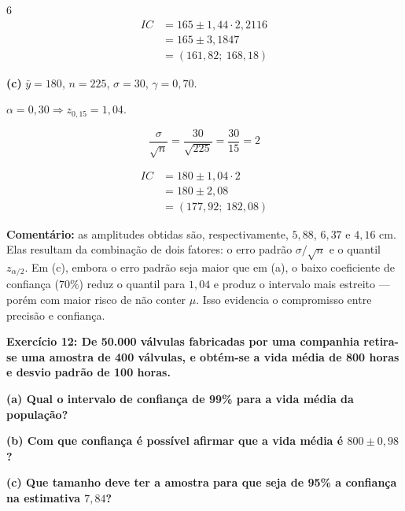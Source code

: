 \documentclass[8pt, a4paper, landscape]{extarticle}
\begin{document}
\begin{multicols}{6}
\begin{equation*}
\begin{split}
IC &= 165 \pm 1,44 \cdot 2,2116 \\
&= 165 \pm 3,1847 \\
&= (161,82;\ 168,18)
\end{split}
\end{equation*}

\vspace{0.2cm}

\textbf{(c)} $\bar{y} = 180$, $n = 225$, $\sigma = 30$, $\gamma = 0,70$.

$\alpha = 0,30 \Rightarrow z_{0,15} = 1,04$.

\begin{equation*}
\frac{\sigma}{\sqrt{n}} = \frac{30}{\sqrt{225}} = \frac{30}{15} = 2
\end{equation*}

\begin{equation*}
\begin{split}
IC &= 180 \pm 1,04 \cdot 2 \\
&= 180 \pm 2,08 \\
&= (177,92;\ 182,08)
\end{split}
\end{equation*}

\vspace{0.2cm}

\textbf{Comentário:} as amplitudes obtidas são, respectivamente, $5,88$, $6,37$ e $4,16$ cm. Elas resultam da combinação de dois fatores: o erro padrão $\sigma/\sqrt{n}$ e o quantil $z_{\alpha/2}$. Em (c), embora o erro padrão seja maior que em (a), o baixo coeficiente de confiança ($70\%$) reduz o quantil para $1,04$ e produz o intervalo mais estreito — porém com maior risco de não conter $\mu$. Isso evidencia o compromisso entre precisão e confiança.

\textbf{Exercício 12: De 50.000 válvulas fabricadas por uma companhia retira-se uma amostra de 400 válvulas, e obtém-se a vida média de 800 horas e desvio padrão de 100 horas.}

\textbf{(a) Qual o intervalo de confiança de 99\% para a vida média da população?}

\textbf{(b) Com que confiança é possível afirmar que a vida média é $800 \pm 0,98$?}

\textbf{(c) Que tamanho deve ter a amostra para que seja de 95\% a confiança na estimativa $7,84$?}


\end{multicols}
\end{document}
